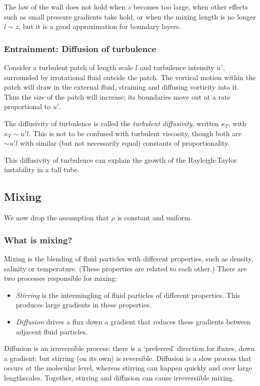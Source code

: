 The law of the wall does not hold when $z$ becomes too large, when other effects
such as small pressure gradients take hold, or when the mixing length is no
longer $l\sim z$, but it is a good approximation for boundary layers. 

\subsubsection{Entrainment: Diffusion of turbulence}

Consider a turbulent patch of length scale $l$ and turbulence intensity $u'$,
surrounded by irrotational fluid outside the patch. The vortical motion within
the patch will draw in the external fluid, straining and diffusing vorticity
into it. Thus the size of the patch will increase; its boundaries move out at a
rate proportional to $u'$. 

The diffusivity of turbulence is called the \textit{turbulent diffusivity},
written $\kappa_T$, with $\kappa_T \sim u'l$. This is not to be confused with
turbulent viscosity, though both are $\sim u'l$ with similar (but not
necessarily equal) constants of proportionality.

This diffusivity of turbulence can explain the growth of the Rayleigh-Taylor
instability in a tall tube. 

\subsection{Mixing}

We now drop the assumption that $\rho$ is constant and uniform.

\subsubsection{What is mixing?}

Mixing is the blending of fluid particles with different properties, such as density, salinity or temperature. (These properties are related to each other.) There are two processes responsible for mixing:
\begin{itemize}
    \item \textit{Stirring} is the intermingling of fluid particles of different properties. This produces large gradients in these properties.
    \item \textit{Diffusion} drives a flux down a gradient that reduces these gradients between adjacent fluid particles.
\end{itemize}
Diffusion is an irreversible process: there is a `preferred' direction for fluxes, down a gradient; but stirring (on its own) is reversible. Diffusion is a slow process that occurs at the molecular level, whereas stirring can happen quickly and over large lengthscales. Together, stirring and diffusion can cause irreversiible mixing.

